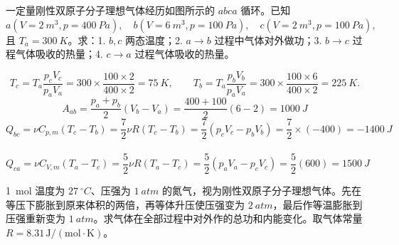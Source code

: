 \documentclass[lang=cn,11pt]{elegantbook}
\begin{document}
\begin{exercise}
一定量刚性双原子分子理想气体经历如图所示的 \(abca\) 循环。已知
 \(a( V=\SI{2}{m^3},p=\SI{400}{Pa}),\quad b( V=\SI{6}{m^3},p=\SI{100}{Pa}),\quad c( V=\SI{2}{m^3},p=\SI{100}{Pa}),\) 
且 \(T_a=\SI{300}{K}\)。求：1. \(b,c\) 两态温度；2. \(a\to b\) 过程中气体对外做功；3. \(b\to c\) 过程气体吸收的热量；4. \(c\to a\) 过程气体吸收的热量。

\begin{center}
\end{center}
\end{exercise}

\begin{solution}
 \[T_c=T_a\frac{p_cV_c}{p_aV_a} =300\times\frac{100\times2}{400\times2} =\SI{75}{K},\qquad T_b=T_a\frac{p_bV_b}{p_aV_a} =300\times\frac{100\times6}{400\times2} =\SI{225}{K}.\] 
\[A_{ab}=\frac{p_a+p_b}{2}(V_b-V_a) =\frac{400+100}{2}(6-2) =\SI{1000}{J}\]
\[Q_{bc}=\nu C_{p,m}(T_c-T_b)=\frac{7}{2}\nu R(T_c-T_b)=\frac72(p_cV_c-p_bV_b)=\frac72\times (-400)=\SI{-1400}{J}\]\
\[Q_{ca}=\nu C_{V,m}(T_a-T_c)=\frac52\nu R(T_a-T_c)=\frac52(p_aV_a-p_cV_c)=\frac52(600)=\SI{1500}{J}\]
\end{solution}

\begin{exercise}
\SI{1}{mol} 温度为 \(\SI{27}{^\circ C}\)、压强为 \(\SI{1}{atm}\) 的氮气，视为刚性双原子分子理想气体。先在等压下膨胀到原来体积的两倍，再等体升压使压强变为 \(\SI{2}{atm}\)，最后作等温膨胀到压强重新变为 \(\SI{1}{atm}\)。求气体在全部过程中对外作的总功和内能变化。取气体常量 \(R=8.31\,\mathrm{J/(mol\cdot K)}\)。
\end{exercise}
\end{document}
